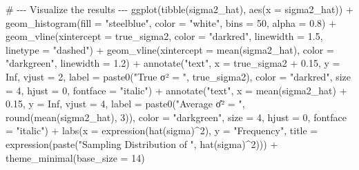 \documentclass[
  letterpaper,
  DIV=11,
  numbers=noendperiod]{scrreprt}
\newenvironment{Shaded}{\begin{snugshade}}{\end{snugshade}}
\newcommand{\AttributeTok}[1]{\textcolor[rgb]{0.40,0.45,0.13}{#1}}
\newcommand{\CommentTok}[1]{\textcolor[rgb]{0.37,0.37,0.37}{#1}}
\newcommand{\ConstantTok}[1]{\textcolor[rgb]{0.56,0.35,0.01}{#1}}
\newcommand{\DecValTok}[1]{\textcolor[rgb]{0.68,0.00,0.00}{#1}}
\newcommand{\FloatTok}[1]{\textcolor[rgb]{0.68,0.00,0.00}{#1}}
\newcommand{\FunctionTok}[1]{\textcolor[rgb]{0.28,0.35,0.67}{#1}}
\newcommand{\NormalTok}[1]{\textcolor[rgb]{0.00,0.23,0.31}{#1}}
\newcommand{\SpecialCharTok}[1]{\textcolor[rgb]{0.37,0.37,0.37}{#1}}
\newcommand{\StringTok}[1]{\textcolor[rgb]{0.13,0.47,0.30}{#1}}
\begin{document}
\begin{Shaded}
\begin{Highlighting}[]
\CommentTok{\# {-}{-}{-} Visualize the results {-}{-}{-}}
\FunctionTok{ggplot}\NormalTok{(}\FunctionTok{tibble}\NormalTok{(sigma2\_hat), }\FunctionTok{aes}\NormalTok{(}\AttributeTok{x =}\NormalTok{ sigma2\_hat)) }\SpecialCharTok{+}
  \FunctionTok{geom\_histogram}\NormalTok{(}\AttributeTok{fill =} \StringTok{"steelblue"}\NormalTok{, }\AttributeTok{color =} \StringTok{"white"}\NormalTok{, }\AttributeTok{bins =} \DecValTok{50}\NormalTok{, }\AttributeTok{alpha =} \FloatTok{0.8}\NormalTok{) }\SpecialCharTok{+}
  \FunctionTok{geom\_vline}\NormalTok{(}\AttributeTok{xintercept =}\NormalTok{ true\_sigma2, }\AttributeTok{color =} \StringTok{"darkred"}\NormalTok{, }\AttributeTok{linewidth =} \FloatTok{1.5}\NormalTok{, }\AttributeTok{linetype =} \StringTok{"dashed"}\NormalTok{) }\SpecialCharTok{+}
  \FunctionTok{geom\_vline}\NormalTok{(}\AttributeTok{xintercept =} \FunctionTok{mean}\NormalTok{(sigma2\_hat), }\AttributeTok{color =} \StringTok{"darkgreen"}\NormalTok{, }\AttributeTok{linewidth =} \FloatTok{1.2}\NormalTok{) }\SpecialCharTok{+}
  \FunctionTok{annotate}\NormalTok{(}\StringTok{"text"}\NormalTok{, }\AttributeTok{x =}\NormalTok{ true\_sigma2 }\SpecialCharTok{+} \FloatTok{0.15}\NormalTok{, }\AttributeTok{y =} \ConstantTok{Inf}\NormalTok{, }\AttributeTok{vjust =} \DecValTok{2}\NormalTok{,}
           \AttributeTok{label =} \FunctionTok{paste0}\NormalTok{(}\StringTok{"True σ² = "}\NormalTok{, true\_sigma2),}
           \AttributeTok{color =} \StringTok{"darkred"}\NormalTok{, }\AttributeTok{size =} \DecValTok{4}\NormalTok{, }\AttributeTok{hjust =} \DecValTok{0}\NormalTok{, }\AttributeTok{fontface =} \StringTok{"italic"}\NormalTok{) }\SpecialCharTok{+}
  \FunctionTok{annotate}\NormalTok{(}\StringTok{"text"}\NormalTok{, }\AttributeTok{x =} \FunctionTok{mean}\NormalTok{(sigma2\_hat) }\SpecialCharTok{+} \FloatTok{0.15}\NormalTok{, }\AttributeTok{y =} \ConstantTok{Inf}\NormalTok{, }\AttributeTok{vjust =} \DecValTok{4}\NormalTok{,}
           \AttributeTok{label =} \FunctionTok{paste0}\NormalTok{(}\StringTok{"Average σ̂² = "}\NormalTok{, }\FunctionTok{round}\NormalTok{(}\FunctionTok{mean}\NormalTok{(sigma2\_hat), }\DecValTok{3}\NormalTok{)),}
           \AttributeTok{color =} \StringTok{"darkgreen"}\NormalTok{, }\AttributeTok{size =} \DecValTok{4}\NormalTok{, }\AttributeTok{hjust =} \DecValTok{0}\NormalTok{, }\AttributeTok{fontface =} \StringTok{"italic"}\NormalTok{) }\SpecialCharTok{+}
  \FunctionTok{labs}\NormalTok{(}\AttributeTok{x =} \FunctionTok{expression}\NormalTok{(}\FunctionTok{hat}\NormalTok{(sigma)}\SpecialCharTok{\^{}}\DecValTok{2}\NormalTok{),}
       \AttributeTok{y =} \StringTok{"Frequency"}\NormalTok{,}
       \AttributeTok{title =} \FunctionTok{expression}\NormalTok{(}\FunctionTok{paste}\NormalTok{(}\StringTok{"Sampling Distribution of "}\NormalTok{, }\FunctionTok{hat}\NormalTok{(sigma)}\SpecialCharTok{\^{}}\DecValTok{2}\NormalTok{))) }\SpecialCharTok{+}
  \FunctionTok{theme\_minimal}\NormalTok{(}\AttributeTok{base\_size =} \DecValTok{14}\NormalTok{)}
\end{Highlighting}
\end{Shaded}
\end{document}
